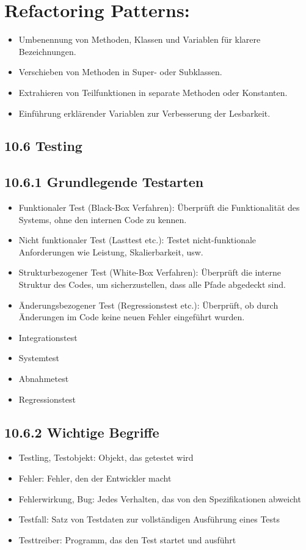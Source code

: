 \section*{Refactoring Patterns:}
\begin{itemize}
  \item Umbenennung von Methoden, Klassen und Variablen für klarere Bezeichnungen.
  \item Verschieben von Methoden in Super- oder Subklassen.
  \item Extrahieren von Teilfunktionen in separate Methoden oder Konstanten.
  \item Einführung erklärender Variablen zur Verbesserung der Lesbarkeit.
\end{itemize}

\subsection*{10.6 Testing}
\subsection*{10.6.1 Grundlegende Testarten}
\begin{itemize}
  \item Funktionaler Test (Black-Box Verfahren): Überprüft die Funktionalität des Systems, ohne den internen Code zu kennen.
  \item Nicht funktionaler Test (Lasttest etc.): Testet nicht-funktionale Anforderungen wie Leistung, Skalierbarkeit, usw.
  \item Strukturbezogener Test (White-Box Verfahren): Überprüft die interne Struktur des Codes, um sicherzustellen, dass alle Pfade abgedeckt sind.
  \item Änderungsbezogener Test (Regressionstest etc.): Überprüft, ob durch Änderungen im Code keine neuen Fehler eingeführt wurden.
  \item Integrationstest
  \item Systemtest
  \item Abnahmetest
  \item Regressionstest
\end{itemize}

\subsection*{10.6.2 Wichtige Begriffe}
\begin{itemize}
  \item Testling, Testobjekt: Objekt, das getestet wird
  \item Fehler: Fehler, den der Entwickler macht
  \item Fehlerwirkung, Bug: Jedes Verhalten, das von den Spezifikationen abweicht
  \item Testfall: Satz von Testdaten zur vollständigen Ausführung eines Tests
  \item Testtreiber: Programm, das den Test startet und ausführt
\end{itemize}


